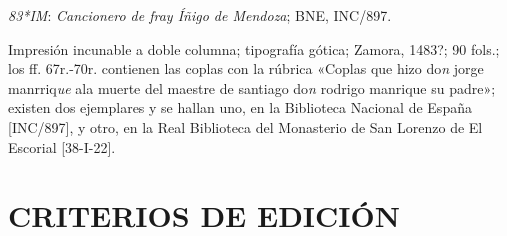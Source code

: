 \documentclass[11pt,a4paper,twoside]{article}
\newcommand{\comillas}[1]{«#1»}
\begin{document}
\textit{83*IM}: \textit{Cancionero de fray Íñigo de Mendoza}; BNE, INC/897.

Impresión incunable a doble columna; tipografía gótica; Zamora, 1483?; 90 fols.; los ff. 67r.-70r. contienen las coplas con la rúbrica \comillas{Coplas que hizo do\textit{n} jorge manrriq\textit{ue} ala muerte del maestre de santiago do\textit{n} rodrigo manrique su padre}; existen dos ejemplares y se hallan uno, en la Biblioteca Nacional de España [INC/897], y otro, en la Real Biblioteca del Monasterio de San Lorenzo de El Escorial [38-I-22].

\section*{{\fontsize{13}{14.35}\selectfont CRITERIOS DE EDICIÓN}}
\end{document}
